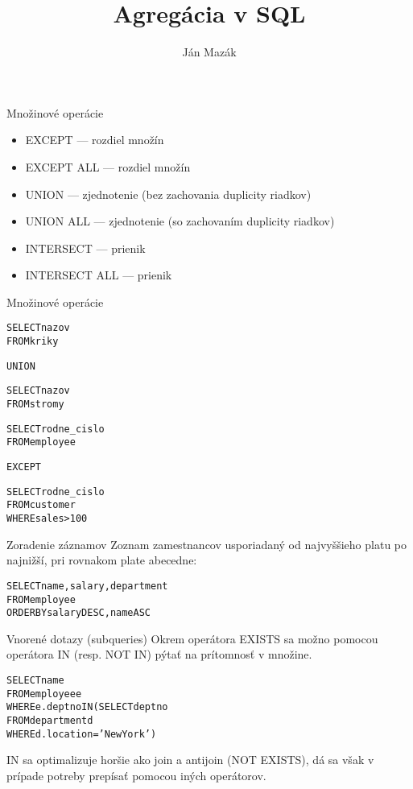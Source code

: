 \documentclass[12pt]{beamer}
\title{Agregácia v SQL}
\author{Ján Mazák}
\institute{FMFI UK Bratislava}
\date{}
\begin{document}
\frame{\titlepage}


\begin{frame}{Množinové operácie}
\begin{itemize}
\item EXCEPT --- rozdiel množín
\item EXCEPT ALL --- rozdiel množín
\item UNION --- zjednotenie (bez zachovania duplicity riadkov)
\item UNION ALL --- zjednotenie (so zachovaním duplicity riadkov)
\item INTERSECT --- prienik
\item INTERSECT ALL --- prienik %
\end{itemize}
\end{frame}

\begin{frame}[fragile]{Množinové operácie}
\begin{minipage}{.4\pdfpagewidth}
\begin{alltt}
SELECT nazov
FROM kriky

\alert{UNION}

SELECT nazov
FROM stromy
\end{alltt}
\end{minipage}
\begin{minipage}{.4\pdfpagewidth}
\begin{alltt}
SELECT rodne_cislo
FROM employee

\alert{EXCEPT}

SELECT rodne_cislo
FROM customer
WHERE sales > 100
\end{alltt}
\end{minipage}
\end{frame}

\begin{frame}[fragile]{Zoradenie záznamov}
Zoznam zamestnancov usporiadaný od najvyššieho platu po najnižší, pri rovnakom plate abecedne:
\begin{alltt}
SELECT name, salary, department
FROM employee
\alert{ORDER BY} salary DESC, name ASC
\end{alltt}
\end{frame}

\begin{frame}[fragile]{Vnorené dotazy (subqueries)}
Okrem operátora EXISTS sa možno pomocou operátora IN (resp. NOT IN) pýtať na prítomnosť v množine.
\begin{alltt}
SELECT name
FROM employee e
WHERE e.deptno \alert{IN} (SELECT deptno
                   FROM department d
                   WHERE d.location = 'New York')
\end{alltt}
IN sa optimalizuje horšie ako join a antijoin (NOT EXISTS), dá sa však v prípade potreby prepísať pomocou iných operátorov.
\end{frame}
\end{document}
